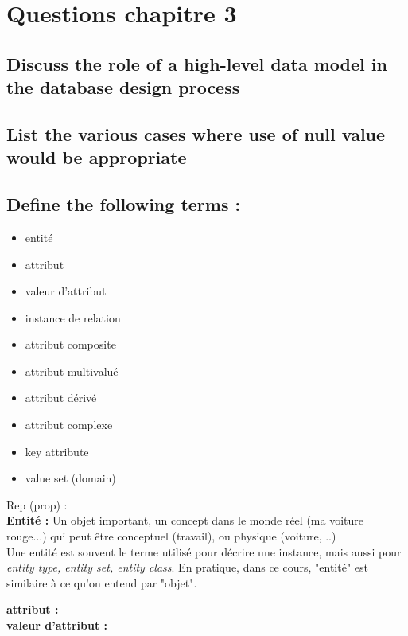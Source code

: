 \section{Questions chapitre 3}

\subsection{Discuss the role of a high-level data model in the database design process}

\subsection{List the various cases where use of null value would be appropriate}

\subsection{Define the following terms :}

\begin{itemize}
	\item entité
	\item attribut
	\item valeur d'attribut
	\item instance de relation
	\item attribut composite 
	\item attribut multivalué
	\item attribut dérivé
	\item attribut complexe
	\item key attribute
	\item value set (domain)
\end{itemize}

\noindent
Rep (prop) :\\ 

\textbf{Entité :} 
Un objet important, un concept dans le monde réel (ma voiture rouge...) qui peut être conceptuel (travail), ou physique (voiture, ..) \\
Une entité est souvent le terme utilisé pour décrire une instance, mais aussi pour \textit{entity type, entity set, entity class}.
En pratique, dans ce cours, "entité" est similaire à ce qu'on entend par "objet".

\textbf{attribut :} \\

\textbf{valeur d'attribut :} \\

